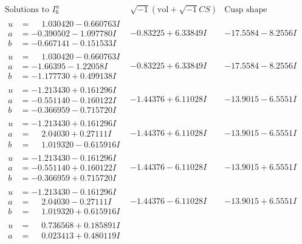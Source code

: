 \documentclass[1p]{elsarticle_modified}
\theoremstyle{definition}
\newcommand{\I}{\sqrt{-1}}
\begin{document}
$$\begin{array}{c|c|c}
\text{Solutions to }I^u_{6}& \I (\text{vol} + \sqrt{-1}CS) & \text{Cusp shape}\\
 \hline 
\begin{aligned}
u &= \phantom{-}1.030420 - 0.660763 I \\
a &= -0.390502 - 1.097780 I \\
b &= -0.667141 - 0.151533 I\end{aligned}
 & -0.83225 + 6.33849 I & -17.5584 - 8.2556 I \\ \hline\begin{aligned}
u &= \phantom{-}1.030420 - 0.660763 I \\
a &= -1.66395 - 1.22058 I \\
b &= -1.177730 + 0.499138 I\end{aligned}
 & -0.83225 + 6.33849 I & -17.5584 - 8.2556 I \\ \hline\begin{aligned}
u &= -1.213430 + 0.161296 I \\
a &= -0.551140 - 0.160122 I \\
b &= -0.366959 - 0.715720 I\end{aligned}
 & -1.44376 + 6.11028 I & -13.9015 - 6.5551 I \\ \hline\begin{aligned}
u &= -1.213430 + 0.161296 I \\
a &= \phantom{-}2.04030 + 0.27111 I \\
b &= \phantom{-}1.019320 - 0.615916 I\end{aligned}
 & -1.44376 + 6.11028 I & -13.9015 - 6.5551 I \\ \hline\begin{aligned}
u &= -1.213430 - 0.161296 I \\
a &= -0.551140 + 0.160122 I \\
b &= -0.366959 + 0.715720 I\end{aligned}
 & -1.44376 - 6.11028 I & -13.9015 + 6.5551 I \\ \hline\begin{aligned}
u &= -1.213430 - 0.161296 I \\
a &= \phantom{-}2.04030 - 0.27111 I \\
b &= \phantom{-}1.019320 + 0.615916 I\end{aligned}
 & -1.44376 - 6.11028 I & -13.9015 + 6.5551 I \\ \hline\begin{aligned}
u &= \phantom{-}0.736568 + 0.185891 I \\
a &= \phantom{-}0.023413 + 0.480119 I \\

\end{aligned}
\end{array}$$
\end{document}
